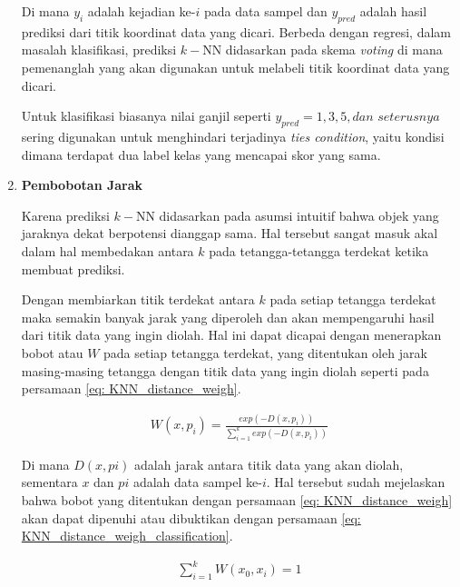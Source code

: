\begin{enumerate}[label=\textbf{\alph*).}]
	Di mana $y_{i}$ adalah kejadian ke-$i$ pada data sampel dan $y_{pred}$ adalah hasil prediksi dari titik koordinat data yang dicari. Berbeda dengan regresi, dalam masalah klasifikasi, prediksi $k-$NN didasarkan pada skema \textit{voting} di mana pemenanglah yang akan digunakan untuk melabeli titik koordinat data yang dicari.
	\vspace{1ex}
	
	Untuk klasifikasi biasanya nilai ganjil seperti $y_{pred} = 1, 3, 5, dan$ $seterusnya$ sering digunakan untuk menghindari terjadinya \textit{ties condition}, yaitu kondisi dimana terdapat dua label kelas yang mencapai skor yang sama.
	
	\item \textbf{Pembobotan Jarak}
	
	Karena prediksi $k-$NN didasarkan pada asumsi intuitif bahwa objek yang jaraknya dekat berpotensi dianggap sama. Hal tersebut sangat masuk akal dalam hal membedakan antara $k$ pada tetangga-tetangga terdekat ketika membuat prediksi. 
	\vspace{1ex}
	
	Dengan membiarkan titik terdekat antara $k$ pada setiap tetangga terdekat maka semakin banyak jarak yang diperoleh dan akan mempengaruhi hasil dari titik data yang ingin diolah. Hal ini dapat dicapai dengan menerapkan bobot atau $W$ pada setiap tetangga terdekat, yang ditentukan oleh jarak masing-masing tetangga dengan titik data yang ingin diolah seperti pada persamaan \ref{eq: KNN_distance_weigh}.
	\vspace{1ex}
	
	\begin{equation}\label{eq: KNN_distance_weigh}
	\begin{split}
	W(x, p_{i}) = \frac{exp(-D(x, p_{i}))}{\sum_{i = 1}^{k}exp(-D(x, p_{i}))}
	\end{split}
	\end{equation}
	
	Di mana $D(x, pi)$ adalah jarak antara titik data yang akan diolah, sementara $x$ dan $pi$ adalah data sampel ke-$i$. Hal tersebut sudah mejelaskan bahwa bobot yang ditentukan dengan persamaan \ref{eq: KNN_distance_weigh} akan dapat dipenuhi atau dibuktikan dengan persamaan \ref{eq: KNN_distance_weigh_classification}.
	
	\begin{equation}\label{eq: KNN_distance_weigh_classification}
	\begin{split}
	\sum_{i = 1}^{k} W(x_{0}, x_{i}) = 1
	\end{split}
	\end{equation}
	

\end{enumerate}
